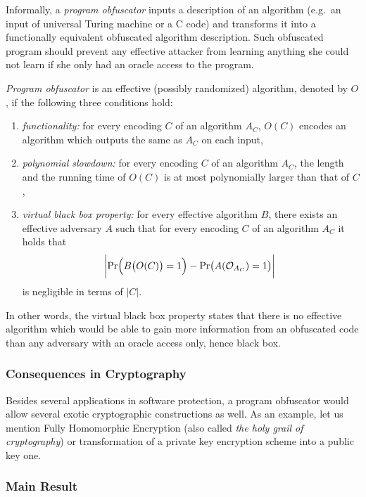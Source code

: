 	Informally, a {\em program obfuscator} inputs a description of an algorithm (e.g.\ an input of universal Turing machine or a C code) and transforms it into a functionally equivalent obfuscated algorithm description. Such obfuscated program should prevent any effective attacker from learning anything she could not learn if she only had an oracle access to the program.
	
	\begin{defn}
	\label{def:obfus}
		{\em Program obfuscator} is an effective (possibly randomized) algorithm, denoted by $O$, if the following three conditions hold:
		\begin{enumerate}
			\item {\em functionality:} for every encoding $C$ of an algorithm $A_C$, $O(C)$ encodes an algorithm which outputs the same as $A_C$ on each input,
			\item {\em polynomial slowdown:} for every encoding $C$ of an algorithm $A_C$, the length and the running time of $O(C)$ is at most polynomially larger than that of $C$,
			\item {\em virtual black box property:} for every effective algorithm $B$, there exists an effective adversary $A$ such that for every encoding $C$ of an algorithm $A_C$ it holds that
			\[
				\biggl| \Pr\Bigl(B\bigl(O(C)\bigr)=1\Bigr) - \Pr\bigl(A({\cal O}_{A_C})=1\bigr) \biggr| \
			\]
			is negligible in terms of $|C|$.
		\end{enumerate}
	\end{defn}
	
	In other words, the virtual black box property states that there is no effective algorithm which would be able to gain more information from an obfuscated code than any adversary with an oracle access only, hence black box.

\subsubsection{Consequences in Cryptography}
	
	Besides several applications in software protection, a program obfuscator would allow several exotic cryptographic constructions as well. As an example, let us mention Fully Homomorphic Encryption (also called {\em the holy grail of cryptography}) or transformation of a private key encryption scheme into a public key one.

\subsubsection{Main Result}
	

